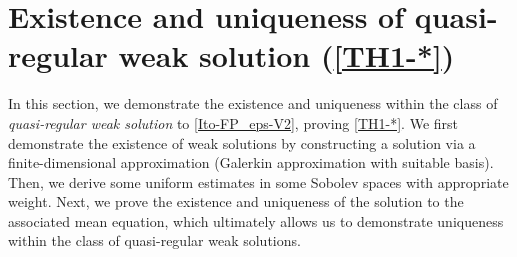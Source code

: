 \documentclass[a4paper,12pt, reqno]{amsart}
\begin{document}
 \section{Existence and uniqueness of  quasi-regular weak solution (\autoref{TH1-*})}\label{Section-exit-uniq}
In this section, we demonstrate the existence and uniqueness within the class of \textit{quasi-regular weak solution} to \eqref{Ito-FP_eps-V2}, proving \autoref{TH1-*}. We first demonstrate the existence of weak solutions by constructing a solution via a finite-dimensional approximation (Galerkin approximation with  suitable basis). Then, we  derive some uniform estimates in some  Sobolev spaces with appropriate weight. Next, we prove the existence and uniqueness of the solution to the associated mean equation, which ultimately allows us to demonstrate uniqueness within the class of quasi-regular weak solutions.
\end{document}
